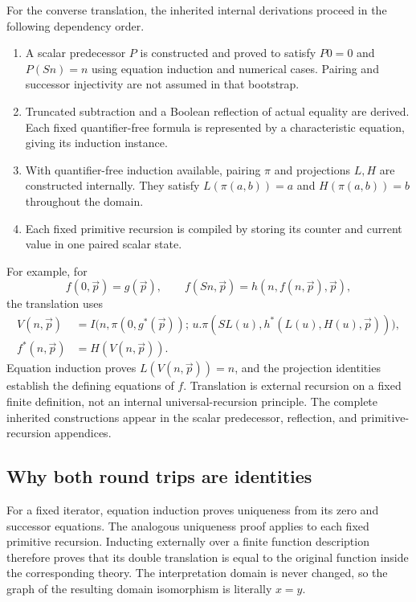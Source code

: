 For the converse translation, the inherited internal derivations proceed
in the following dependency order.
\begin{enumerate}
\item A scalar predecessor $P$ is constructed and proved to satisfy
  $P0=0$ and $P(Sn)=n$ using equation induction and numerical cases.
  Pairing and successor injectivity are not assumed in that bootstrap.
\item Truncated subtraction and a Boolean reflection of actual equality
  are derived. Each fixed quantifier-free formula is represented by a
  characteristic equation, giving its induction instance.
\item With quantifier-free induction available, pairing $\pi$ and
  projections $L,H$ are constructed internally. They satisfy
  $L(\pi(a,b))=a$ and $H(\pi(a,b))=b$ throughout the domain.
\item Each fixed primitive recursion is compiled by storing its counter
  and current value in one paired scalar state.
\end{enumerate}

For example, for
\[
 f(0,\vec p)=g(\vec p),\qquad
 f(Sn,\vec p)=h(n,f(n,\vec p),\vec p),
\]
the translation uses
\[
\begin{split}
 V(n,\vec p)&=I\bigl(n,\pi(0,g^*(\vec p));\,
 u.\pi(SL(u),h^*(L(u),H(u),\vec p))\bigr),\\
 f^*(n,\vec p)&=H(V(n,\vec p)).
\end{split}
\]
Equation induction proves $L(V(n,\vec p))=n$, and the projection
identities establish the defining equations of $f$. Translation is
external recursion on a fixed finite definition, not an internal
universal-recursion principle. The complete inherited constructions
appear in the scalar predecessor, reflection, and primitive-recursion
appendices.

\subsection{Why both round trips are identities}

For a fixed iterator, equation induction proves uniqueness from its
zero and successor equations. The analogous uniqueness proof applies
to each fixed primitive recursion. Inducting externally over a finite
function description therefore proves that its double translation is
equal to the original function inside the corresponding theory. The
interpretation domain is never changed, so the graph of the resulting
domain isomorphism is literally $x=y$.

